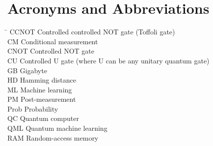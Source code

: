 \section*{Acronyms and Abbreviations}
\begin{tabbing}
 \hspace*{1.6cm}  \= \kill
 CCNOT \> Controlled controlled NOT gate (Toffoli gate) \\[0.5ex]
 CM \> Conditional measurement \\[0.5ex]
 CNOT \> Controlled NOT gate \\[0.5ex]
 CU \> Controlled U gate (where U can be any unitary quantum gate) \\[0.5ex]
 GB \> Gigabyte \\[0.5ex]
 HD \> Hamming distance \\[0.5ex]
 ML \> Machine learning \\[0.5ex]
 PM \> Post-measurement \\[0.5ex]
 Prob \> Probability \\[0.5ex]
 QC \> Quantum computer \\[0.5ex]
 QML \> Quantum machine learning \\[0.5ex]
 RAM \> Random-access memory \\[0.5ex]
 
\end{tabbing}

 \cleardoublepage

